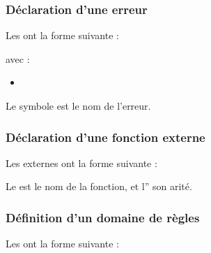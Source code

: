 \documentclass[letterpaper,10pt,french]{sphinxmanual}
\begin{document}
\subsubsection{Déclaration d’une erreur}
\label{\detokenize{syntax:declaration-d-une-erreur}}
\sphinxAtStartPar
Les  ont la forme suivante :

\begin{sphinxVerbatim}[commandchars=\\\{\}]
              
\end{sphinxVerbatim}

\sphinxAtStartPar
avec :
\begin{itemize}
\item {} 
\sphinxAtStartPar
{}

\end{itemize}

\sphinxAtStartPar
Le symbole est le nom de l’erreur.


\subsubsection{Déclaration d’une fonction externe}
\label{\detokenize{syntax:declaration-d-une-fonction-externe}}
\sphinxAtStartPar
Les  externes ont la forme suivante :

\begin{sphinxVerbatim}[commandchars=\\\{\}]
     
\end{sphinxVerbatim}

\sphinxAtStartPar
Le  est le nom de la fonction, et l” son arité.


\subsubsection{Définition d’un domaine de règles}
\label{\detokenize{syntax:definition-d-un-domaine-de-regles}}
\sphinxAtStartPar
Les  ont la forme suivante :
\end{document}
